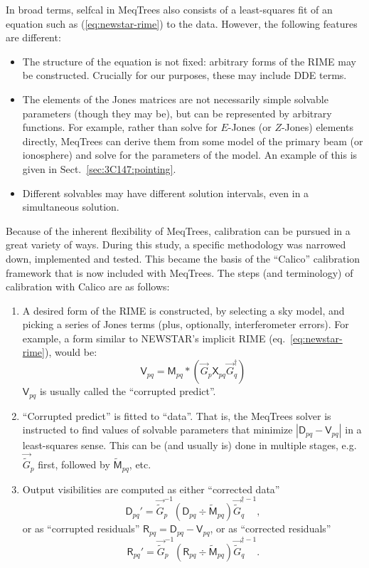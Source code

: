 \documentclass[]{aa}
\newcommand{\jones}[2]{\vec {#1}_{#2}}
\newcommand{\jonesinv}[2]{\vec {#1}^{-1}_{#2}}
\newcommand{\jonesT}[2]{\vec {#1}^\dagger_{#2}}
\newcommand{\jonesTinv}[2]{\vec {#1}^{\dagger-1}_{#2}}
\newcommand{\coh}[2]{\mathsf{{#1}}_{{#2}}}
\begin{document}
In broad terms, selfcal in MeqTrees also consists of a least-squares fit of an equation such as (\ref{eq:newstar-rime}) to the data. However, the following features are different:

\begin{itemize}
\item The structure of the equation is not fixed: arbitrary forms of the RIME may be constructed. Crucially for our purposes, these may include DDE terms.
\item The elements of the Jones matrices are not necessarily simple solvable parameters (though they may be), but can be represented by arbitrary functions. For example, rather than solve for $E$-Jones (or $Z$-Jones) elements directly, MeqTrees can derive them from some model of the primary beam (or ionosphere) and solve for the parameters of the model. An example of this is given in Sect.~\ref{sec:3C147:pointing}.
\item Different solvables may have different solution intervals, even in a simultaneous solution.
\end{itemize}

Because of the inherent flexibility of MeqTrees, calibration can be pursued in a great variety of ways. During this study, a specific methodology was narrowed down, implemented and tested. This became the basis of the ``Calico'' calibration framework that is now included with MeqTrees. The steps (and terminology) of calibration with Calico are as follows:

\begin{enumerate}
\item A desired form of the RIME is constructed, by selecting a sky model, and picking a series of Jones terms (plus, optionally, interferometer errors). For example, a form similar to NEWSTAR's implicit RIME (eq.~\ref{eq:newstar-rime}), would be:
\[
\coh{V}{pq} =  \coh{M}{pq} \ast ( \jones{G}{p} \coh{X}{pq} \jonesT{G}{q} ) 
\]
$\coh{V}{pq}$ is usually called the ``corrupted predict''.
\item ``Corrupted predict'' is fitted to ``data''. That is, the MeqTrees solver is instructed to find values of solvable parameters that minimize $|\coh{D}{pq}-\coh{V}{pq}|$ in a least-squares sense. This can be (and usually is) done in multiple stages, e.g. $\jones{\tilde{G}}{p}$ first, followed by $\coh{\tilde{M}}{pq}$, etc.
\item Output visibilities are computed as either ``corrected data''
\[
\coh{D}{pq}' = \jonesinv{\tilde{G}}{p} (\coh{D}{pq} \div \coh{\tilde{M}}{pq}) \jonesTinv{\tilde{G}}{q},
\]
or as ``corrupted residuals'' $\coh{R}{pq} = \coh{D}{pq}-\coh{V}{pq}$, or as ``corrected residuals''
\[
\coh{R}{pq}' = \jonesinv{\tilde{G}}{p} (\coh{R}{pq} \div \coh{\tilde{M}}{pq}) \jonesTinv{\tilde{G}}{q}.
\]
\end{enumerate}
\end{document}
